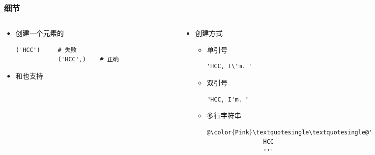 \begin{frame} [fragile]
	\frametitle{细节}
	\linespread{1.25}
	\begin{columns}[T]
		\begin{column}[T]{.5\textwidth}
			\begin{itemize}
			\item 创建一个元素的 
			\begin{lstlisting}[style=pythonstyle, gobble=12, texcl]
			('HCC')		# 失败
			('HCC',)	# 正确
			\end{lstlisting}
			\item {}和也支持
			\end{itemize}
		\end{column}
		\begin{column}[T]{.5\textwidth}
			\begin{itemize}
			\item {}创建方式
				\begin{itemize}
				\item 单引号
				\begin{lstlisting}[style=pythonstyle, gobble=16, texcl]
				'HCC, I\'m. '
				\end{lstlisting}
				\end{itemize}
				\begin{itemize}
				\item 双引号
				\begin{lstlisting}[style=pythonstyle, gobble=16, texcl]
				"HCC, I'm. "
				\end{lstlisting}
				\end{itemize}
				\begin{itemize}
				\item 多行字符串
				\begin{lstlisting}[style=pythonstyle, gobble=16, escapechar=@]
				@\color{Pink}\textquotesingle\textquotesingle@'
				HCC
				'''
				\end{lstlisting}
				\end{itemize}
			\end{itemize}
		\end{column}
	\end{columns}
\end{frame}

